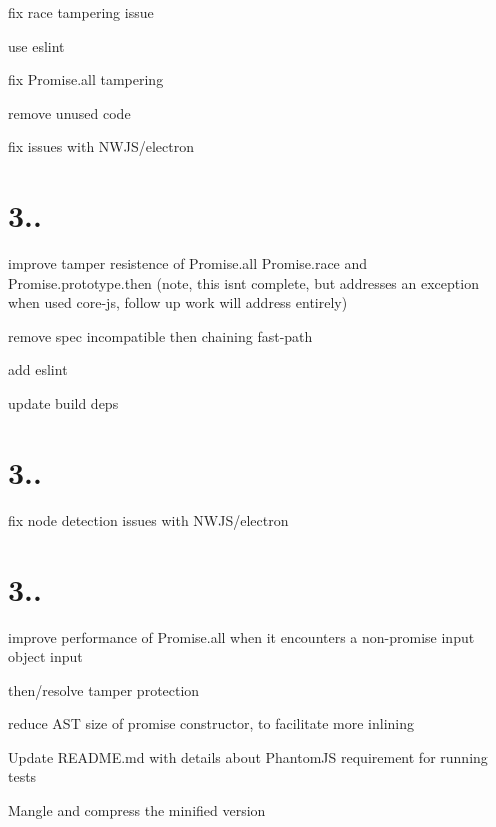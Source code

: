\begin{DoxyItemize}
\item fix race tampering issue
\item use eslint
\item fix Promise.\+all tampering
\item remove unused code
\item fix issues with N\+W\+J\+S/electron
\end{DoxyItemize}

\section*{3..}


\begin{DoxyItemize}
\item improve tamper resistence of Promise.\+all Promise.\+race and Promise.\+prototype.\+then (note, this isn\textquotesingle{}t complete, but addresses an exception when used  core-\/js, follow up work will address entirely)
\item remove spec incompatible then chaining fast-\/path
\item add eslint
\item update build deps
\end{DoxyItemize}

\section*{3..}


\begin{DoxyItemize}
\item fix node detection issues with N\+W\+J\+S/electron
\end{DoxyItemize}

\section*{3..}


\begin{DoxyItemize}
\item improve performance of Promise.\+all when it encounters a non-\/promise input object input
\item then/resolve tamper protection
\item reduce A\+ST size of promise constructor, to facilitate more inlining
\item Update R\+E\+A\+D\+M\+E.\+md with details about Phantom\+JS requirement for running tests
\item Mangle and compress the minified version
\end{DoxyItemize}

